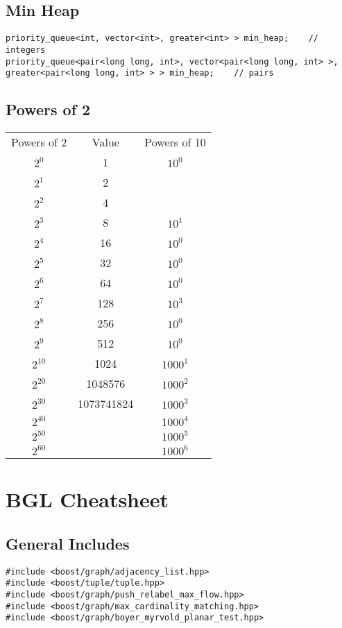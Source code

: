 \documentclass[11pt]{article}
\let\stdsection\section
\renewcommand\section{\newpage\stdsection}
\begin{document}
\subsection{Min Heap}
\begin{lstlisting}
priority_queue<int, vector<int>, greater<int> > min_heap;    // integers
priority_queue<pair<long long, int>, vector<pair<long long, int> >, greater<pair<long long, int> > > min_heap;    // pairs
\end{lstlisting}

\subsection{Powers of 2}
\begin{tabular}{ccc}
  Powers of 2 & Value & Powers of 10 \\
  $2^{0}$ & 1 & $10^{0}$ \\
  $2^{1}$ & 2 &  \\
  $2^{2}$ & 4 &  \\
  $2^{3}$ & 8 & $10^{1}$ \\
  $2^{4}$ & 16 & $10^{0}$ \\
  $2^{5}$ & 32 & $10^{0}$ \\
  $2^{6}$ & 64 & $10^{0}$ \\
  $2^{7}$ & 128 & $10^{3}$ \\
  $2^{8}$ & 256 & $10^{0}$ \\
  $2^{9}$ & 512 & $10^{0}$ \\
  $2^{10}$ & 1024 & $1000^{1}$ \\
  $2^{20}$ & 1048576 & $1000^{2}$ \\
  $2^{30}$ & 1073741824 & $1000^{3}$ \\
  $2^{40}$ &  & $1000^{4}$ \\
  $2^{50}$ &  & $1000^{5}$ \\
  $2^{60}$ &  & $1000^{6}$ \\
 \end{tabular}


\section{BGL Cheatsheet}
\subsection{General Includes}
\begin{lstlisting}
#include <boost/graph/adjacency_list.hpp>
#include <boost/tuple/tuple.hpp>
#include <boost/graph/push_relabel_max_flow.hpp>
#include <boost/graph/max_cardinality_matching.hpp>
#include <boost/graph/boyer_myrvold_planar_test.hpp>
\end{lstlisting}
\end{document}
